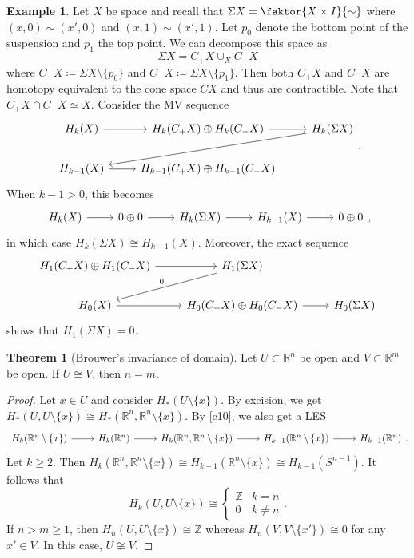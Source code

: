 \documentclass[10pt,letterpaper,cm]{nupset}
\theoremstyle{definition}
\newtheorem{exmp}[definition]{Example}
\theoremstyle{theorem}
\newtheorem{theorem}[definition]{Theorem}
\theoremstyle{remark}
\newcommand{\R}{\mathbb{R}}
\newcommand{\Z}{\mathbb Z}
\newcommand{\1}{\mathbb{1}}
\newcommand{\0}{\vec 0}
\begin{document}
\begin{exmp}
Let $X$ be space and recall that $\Sigma{X}= \faktor{X \times I}{\sim}$ where $(x,0) \sim (x', 0)$ and $(x,1) \sim (x', 1)$. Let $p_0$ denote the bottom point of the suspension and $p_1$ the top point. We can decompose this space as $$ \Sigma{X} = C_+{X} \cup_X C_{-}{X} $$ where $C_+{X} \coloneqq  \Sigma{X} \setminus \{p_0\}$ and $C_{-}{X} \coloneqq \Sigma{X} \setminus \{p_1\}$. Then both $C_+{X}$ and $C_{-}{X}$ are homotopy equivalent to the cone space $C{X}$ and thus are contractible. Note that $ C_+{X} \cap C_{-}{X} \simeq X$. Consider the MV sequence
\[
\begin{tikzcd}
H_k(X) \arrow[r] & H_k(C_+{X})\oplus H_k(C_{-}{X}) \arrow[r] & H_k(\Sigma{X}) \arrow[lld] \\
H_{k-1}(X) \arrow[r]                    & H_{k-1}(C_+{X})\oplus H_{k-1}(C_{-}{X})   &                           
\end{tikzcd}
.\] When $k-1>0$, this becomes
\[
\begin{tikzcd}
H_k(X) \arrow[r] & 0\oplus 0 \arrow[r] & H_k(\Sigma{X}) \arrow[r] &
H_{k-1}(X) \arrow[r]                    & 0\oplus 0                           
\end{tikzcd}
,\] in which case $H_k(\Sigma{X}) \cong H_{k-1}(X)$. Moreover, the exact sequence
\[
\begin{tikzcd}
H_1(C_+{X})\oplus H_1(C_{-}{X}) \arrow[r] & H_1(\Sigma{X}) \arrow[ld, "0"']             &                \\
H_0(X) \arrow[r]                          & H_0(C_{+}{X})\oplus H_0(C_{-}{X}) \arrow[r] & H_0(\Sigma{X})
\end{tikzcd}
\] shows that $H_1(\Sigma{X}) =0$.
\end{exmp}

\begin{theorem}[Brouwer's invariance of domain]
Let $U\subset \R^n$ be open and $V\subset \R^m$ be open. If $U \cong V$, then $n=m$.
\end{theorem}
\begin{proof}
Let $x\in U$ and consider $H_{\ast}(U \setminus \{x\})$. By excision, we get $H_{\ast}(U, U \setminus \{x\}) \cong H_{\ast}(\R^n, \R^n \setminus \{x\})$. By \cref{c10}, we also get a LES
\[
\begin{tikzcd}
H_{k}(\R^n \setminus \{x\}) \arrow[r] & H_{k}(\R^n) \arrow[r] & {H_{k}(\R^n, \R^n \setminus \{x\})} \arrow[r] & H_{k-1}(\R^n \setminus \{x\}) \arrow[r] & H_{k -1}(\R^n)
\end{tikzcd}
. \] Let $k\geq 2$. Then $H_k(\R^n, \R^n \setminus \{x\}) \cong H_{k-1}(\R^n \setminus \{x\}) \cong H_{k-1}(S^{n-1}).$ It follows that $$H_k(U, U \setminus \{x\}) \cong \begin{cases} \Z & k=n \\ 0 & k \ne n \end{cases}.$$ If $n >m \geq 1$, then $H_n(U, U \setminus \{x\}) \cong \Z$ whereas $H_n(V, V \setminus \{x'\}) \cong 0$ for any $x' \in V$. In this case, $U \not \cong V$.
\end{proof}
\end{document}

